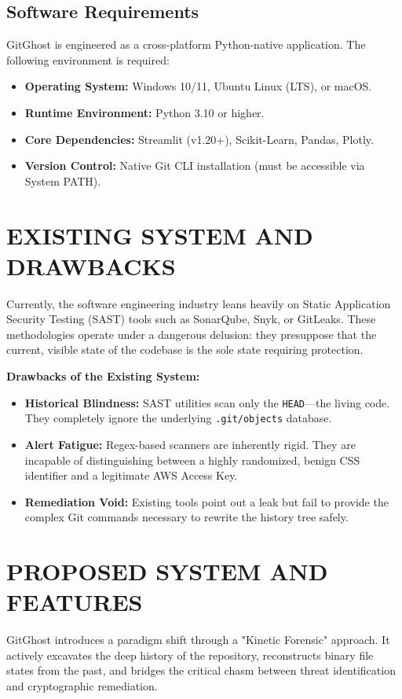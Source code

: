 \documentclass[12pt, a4paper, oneside]{report}
\begin{document}
\subsection{Software Requirements}
GitGhost is engineered as a cross-platform Python-native application. The following environment is required:
\begin{itemize}
    \item \textbf{Operating System:} Windows 10/11, Ubuntu Linux (LTS), or macOS.
    \item \textbf{Runtime Environment:} Python 3.10 or higher.
    \item \textbf{Core Dependencies:} Streamlit (v1.20+), Scikit-Learn, Pandas, Plotly.
    \item \textbf{Version Control:} Native Git CLI installation (must be accessible via System PATH).
\end{itemize}

\section{EXISTING SYSTEM AND DRAWBACKS}
Currently, the software engineering industry leans heavily on Static Application Security Testing (SAST) tools such as SonarQube, Snyk, or GitLeaks. These methodologies operate under a dangerous delusion: they presuppose that the current, visible state of the codebase is the sole state requiring protection.

\textbf{Drawbacks of the Existing System:}
\begin{itemize}
    \item \textbf{Historical Blindness:} SAST utilities scan only the \texttt{HEAD}—the living code. They completely ignore the underlying \texttt{.git/objects} database.
    \item \textbf{Alert Fatigue:} Regex-based scanners are inherently rigid. They are incapable of distinguishing between a highly randomized, benign CSS identifier and a legitimate AWS Access Key.
    \item \textbf{Remediation Void:} Existing tools point out a leak but fail to provide the complex Git commands necessary to rewrite the history tree safely.
\end{itemize}

\section{PROPOSED SYSTEM AND FEATURES}
GitGhost introduces a paradigm shift through a "Kinetic Forensic" approach. It actively excavates the deep history of the repository, reconstructs binary file states from the past, and bridges the critical chasm between threat identification and cryptographic remediation.
\end{document}

